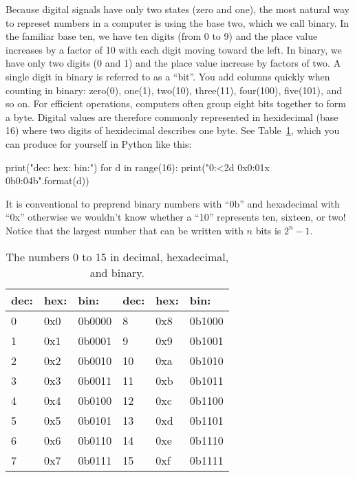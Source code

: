 Because digital signals have only two states (zero and one), the most
natural way to represet numbers in a computer is using the base two,
which we call binary.  In the familiar base ten, we have ten digits
(from 0 to 9) and the place value increases by a factor of 10 with
each digit moving toward the left.  In binary, we have only two digits
(0 and 1) and the place value increase by factors of two.  A single
digit in binary is referred to as a ``bit''.  You add columns quickly
when counting in binary: zero(0), one(1), two(10), three(11),
four(100), five(101), and so on.  For efficient operations, computers
often group eight bits together to form a byte.  Digital values are
therefore commonly represented in hexidecimal (base 16) where two
digits of hexidecimal describes one byte.  See Table~\ref{tbl:binary},
which you can produce for yourself in Python like this:
\begin{python}
print("dec: hex: bin:")
for d in range(16):
    print("{0:<2d}   0x{0:01x}   0b{0:04b}".format(d))
\end{python}
It is conventional to preprend binary numbers with ``0b'' and
hexadecimal with ``0x'' otherwise we wouldn't know whether a ``10''
represents ten, sixteen, or two!  Notice that the largest number that
can be written with $n$ bits is $2^n-1$.

\begin{table}
\begin{center}
  \caption{The numbers 0 to 15 in decimal, hexadecimal, and binary.}
  \label{tbl:binary}
\begin{tabular}{|lll|lll|}
\hline
dec: & hex: & bin: & dec: & hex: & bin: \\
\hline
0  & 0x0  & 0b0000 & 8  & 0x8  & 0b1000 \\ 
1  & 0x1  & 0b0001 & 9  & 0x9  & 0b1001 \\
2  & 0x2  & 0b0010 & 10 & 0xa  & 0b1010 \\
3  & 0x3  & 0b0011 & 11 & 0xb  & 0b1011 \\
4  & 0x4  & 0b0100 & 12 & 0xc  & 0b1100 \\ 
5  & 0x5  & 0b0101 & 13 & 0xd  & 0b1101 \\
6  & 0x6  & 0b0110 & 14 & 0xe  & 0b1110 \\
7  & 0x7  & 0b0111 & 15 & 0xf  & 0b1111 \\
\hline
\end{tabular}
\end{center}
\end{table}

